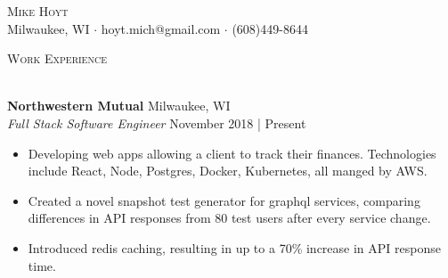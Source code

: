 \documentclass[a4paper]{article}
\newcommand{\lineunder} {
    \vspace*{-8pt} \\
    \hspace*{-18pt} \hrulefill \\
}
\newcommand{\header} [1] {
    {\hspace*{-18pt}\vspace*{6pt} \textsc{#1}}
    \vspace*{-6pt} \lineunder
}
\begin{document}
\vspace*{-40pt}



\vspace*{-10pt}
\begin{center}
	{\Huge \scshape {Mike Hoyt}}\\
	Milwaukee, WI $\cdot$ hoyt.mich@gmail.com $\cdot$ (608)449-8644\\
\end{center}


\header{Work Experience}
\vspace{1mm}

\textbf{Northwestern Mutual} \hfill Milwaukee, WI\\
\textit{Full Stack Software Engineer} \hfill November 2018 | Present\\
\vspace{-1mm}
\begin{itemize} \itemsep 1pt
	\item Developing web apps allowing a client to track their finances. Technologies include React, Node, Postgres, Docker, Kubernetes, all manged by AWS.
	\item Created a novel snapshot test generator for graphql services, comparing differences in API responses from 80 test users after every service change.
	\item Introduced redis caching, resulting in up to a 70\% increase in API response time.
\end{itemize}
\vspace{-1mm}
\end{document}
